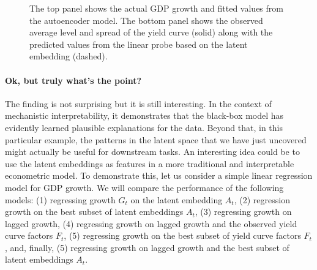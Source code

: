 \documentclass{article}
\theoremstyle{plain}
\theoremstyle{definition}
\theoremstyle{remark}
\begin{document}
\begin{figure}


\caption{\label{fig-dl-results}The top panel shows the actual GDP growth
and fitted values from the autoencoder model. The bottom panel shows the
observed average level and spread of the yield curve (solid) along with
the predicted values from the linear probe based on the latent embedding
(dashed).}

\end{figure}%

\paragraph{Ok, but truly what's the
point?}\label{ok-but-truly-whats-the-point}

The finding is not surprising but it is still interesting. In the
context of mechanistic interpretability, it demonstrates that the
black-box model has evidently learned plausible explanations for the
data. Beyond that, in this particular example, the patterns in the
latent space that we have just uncovered might actually be useful for
downstream tasks. An interesting idea could be to use the latent
embeddings as features in a more traditional and interpretable
econometric model. To demonstrate this, let us consider a simple linear
regression model for GDP growth. We will compare the performance of the
following models: (1) regressing growth \(G_t\) on the latent embedding
\(A_t\), (2) regression growth on the best subset of latent embeddings
\(A_t\), (3) regressing growth on lagged growth, (4) regressing growth
on lagged growth and the observed yield curve factors \(F_t\), (5)
regressing growth on the best subset of yield curve factors \(F_t\),
and, finally, (5) regressing growth on lagged growth and the best subset
of latent embeddings \(A_t\).
\end{document}
